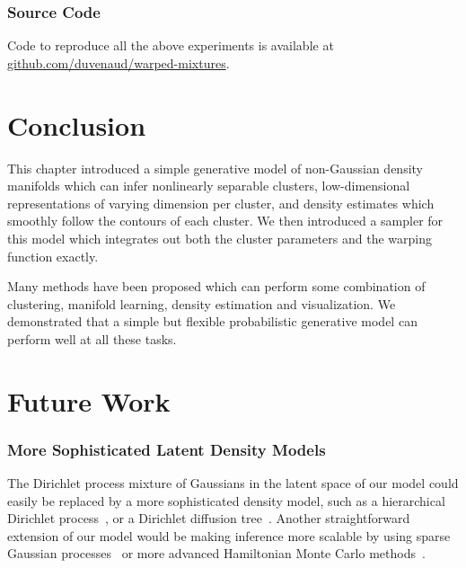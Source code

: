 \subsubsection{Source Code}
Code to reproduce all the above experiments is available at \url{github.com/duvenaud/warped-mixtures}.


\section{Conclusion}

This chapter introduced a simple generative model of non-Gaussian density manifolds which can infer nonlinearly separable clusters, low-dimensional representations of varying dimension per cluster, and density estimates which smoothly follow the contours of each cluster.
We then introduced a sampler for this model which integrates out both the cluster parameters and the warping function exactly.

Many methods have been proposed which can perform some combination of clustering, manifold learning, density estimation and visualization.
We demonstrated that a simple but flexible probabilistic generative model can perform well at all these tasks.



\section{Future Work}


\subsubsection{More Sophisticated Latent Density Models}
The Dirichlet process mixture of Gaussians in the latent space of our model could easily be replaced by a more sophisticated density model, such as a hierarchical Dirichlet process~\citep{teh2006hierarchical}, or a Dirichlet diffusion tree~\citep{neal2003density}.
Another straightforward extension of our model would be making inference more scalable by using sparse Gaussian processes~\citep{quinonero2005unifying,snelson2006sparse} or more advanced Hamiltonian Monte Carlo methods~\citep{zhang2011quasi}.


